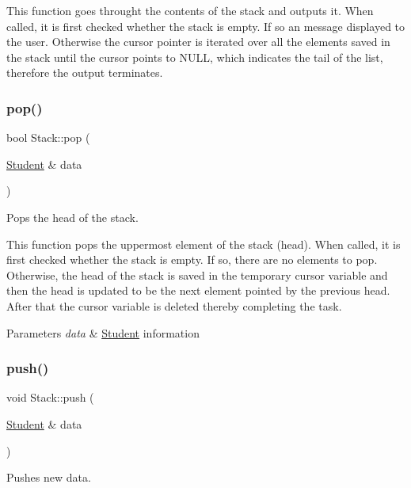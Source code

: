 This function goes throught the contents of the stack and outputs it. When called, it is first checked whether the stack is empty. If so an message displayed to the user. Otherwise the cursor pointer is iterated over all the elements saved in the stack until the cursor points to N\+U\+LL, which indicates the tail of the list, therefore the output terminates. \mbox{\label{class_stack_a4e55c97d719b832e159894421f7b9d3d}} 
\subsubsection{\texorpdfstring{pop()}{pop()}}
{\footnotesize\ttfamily bool Stack\+::pop (\begin{DoxyParamCaption}\item[{\hyperlink{class_student}{Student} \&}]{data }\end{DoxyParamCaption})}



Pops the head of the stack. 

This function pops the uppermost element of the stack (head). When called, it is first checked whether the stack is empty. If so, there are no elements to pop. Otherwise, the head of the stack is saved in the temporary cursor variable and then the head is updated to be the next element pointed by the previous head. After that the cursor variable is deleted thereby completing the task.


\begin{DoxyParams}{Parameters}
{\em data} & \hyperlink{class_student}{Student} information \\
\hline
\end{DoxyParams}
\mbox{\label{class_stack_a1dcd555343970b129f9c1ce97a124d9c}} 
\subsubsection{\texorpdfstring{push()}{push()}}
{\footnotesize\ttfamily void Stack\+::push (\begin{DoxyParamCaption}\item[{\hyperlink{class_student}{Student} \&}]{data }\end{DoxyParamCaption})}



Pushes new data. 

